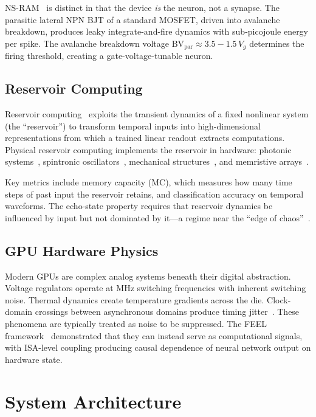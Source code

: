 \documentclass[11pt]{article}
\begin{document}
NS-RAM~\cite{lanza2024, pazos2024nsram} is distinct in that
the device \emph{is} the neuron, not a synapse.  The parasitic
lateral NPN BJT of a standard MOSFET, driven into avalanche
breakdown, produces leaky integrate-and-fire dynamics with
sub-picojoule energy per spike.  The avalanche breakdown
voltage $\text{BV}_\text{par} \approx 3.5 - 1.5\,V_g$
determines the firing threshold, creating a gate-voltage-tunable
neuron.

\subsection{Reservoir Computing}

Reservoir computing~\cite{jaeger2001, maass2002} exploits
the transient dynamics of a fixed nonlinear system (the
``reservoir'') to transform temporal inputs into
high-dimensional representations from which a trained linear
readout extracts computations.  Physical reservoir computing
implements the reservoir in hardware: photonic
systems~\cite{vandoorne2014}, spintronic
oscillators~\cite{torrejon2017}, mechanical
structures~\cite{nakajima2015}, and memristive
arrays~\cite{du2017, moon2019}.

Key metrics include memory capacity (MC), which measures how
many time steps of past input the reservoir retains, and
classification accuracy on temporal waveforms.  The echo-state
property requires that reservoir dynamics be influenced by
input but not dominated by it---a regime near the ``edge of
chaos''~\cite{langton1990, bertschinger2004}.

\subsection{GPU Hardware Physics}

Modern GPUs are complex analog systems beneath their digital
abstraction.  Voltage regulators operate at MHz switching
frequencies with inherent switching noise.  Thermal dynamics
create temperature gradients across the die.  Clock-domain
crossings between asynchronous domains produce timing
jitter~\cite{zhan2018}.  These phenomena are typically treated
as noise to be suppressed.  The FEEL framework~\cite{feel2026}
demonstrated that they can instead serve as computational
signals, with ISA-level coupling producing causal dependence
of neural network output on hardware state.


\section{System Architecture}
\label{sec:architecture}
\end{document}

